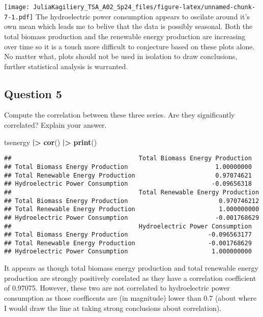 \documentclass[
]{article}
\newenvironment{Shaded}{\begin{snugshade}}{\end{snugshade}}
\newcommand{\FunctionTok}[1]{\textcolor[rgb]{0.13,0.29,0.53}{\textbf{#1}}}
\newcommand{\NormalTok}[1]{#1}
\newcommand{\SpecialCharTok}[1]{\textcolor[rgb]{0.81,0.36,0.00}{\textbf{#1}}}
\begin{document}
\texttt{[image: JuliaKagiliery\_TSA\_A02\_Sp24\_files/figure-latex/unnamed-chunk-7-1.pdf]}
The hydroelectric power consumption appears to oscilate around it's own
mean which leads me to belive that the data is possibly seasonal. Both
the total biomass production and the renewable energy production are
increasing over time so it is a touch more difficult to conjecture based
on these plots alone. No matter what, plots should not be used in
isolation to draw conclusions, further statistical analysis is
warranted.

\hypertarget{question-5}{%
\subsection{Question 5}\label{question-5}}

Compute the correlation between these three series. Are they
significantly correlated? Explain your answer.

\begin{Shaded}
\begin{Highlighting}[]
\NormalTok{tsenergy }\SpecialCharTok{|\textgreater{}}
  \FunctionTok{cor}\NormalTok{() }\SpecialCharTok{|\textgreater{}}
  \FunctionTok{print}\NormalTok{()}
\end{Highlighting}
\end{Shaded}

\begin{verbatim}
##                                   Total Biomass Energy Production
## Total Biomass Energy Production                        1.00000000
## Total Renewable Energy Production                      0.97074621
## Hydroelectric Power Consumption                       -0.09656318
##                                   Total Renewable Energy Production
## Total Biomass Energy Production                         0.970746212
## Total Renewable Energy Production                       1.000000000
## Hydroelectric Power Consumption                        -0.001768629
##                                   Hydroelectric Power Consumption
## Total Biomass Energy Production                      -0.096563177
## Total Renewable Energy Production                    -0.001768629
## Hydroelectric Power Consumption                       1.000000000
\end{verbatim}

It appears as though total biomass energy production and total renewable
energy production are strongly positively corelated as they have a
correlation coefficient of 0.97075. However, these two are not
correlated to hydroelectric power consumption as those coefficents are
(in magnitude) lower than 0.7 (about where I would draw the line at
taking strong conclusions about correlation).
\end{document}
